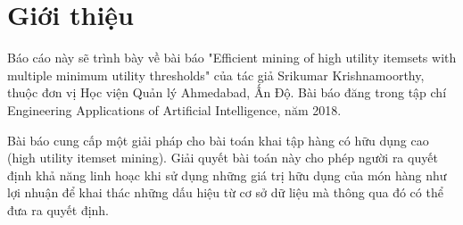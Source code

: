 



 



%

\newpage
\renewcommand{\contentsname}{Mục lục}
\tableofcontents
\newpage
\renewcommand{\listfigurename}{Hình}
\listoffigures
\newpage

\section{Giới thiệu}
Báo cáo này sẽ trình bày về bài báo "Efficient mining of high utility itemsets with multiple minimum utility thresholds" \cite{krishnamoorthy2018efficient} của tác giả Srikumar Krishnamoorthy, thuộc đơn vị Học viện Quản lý Ahmedabad, Ấn Độ. Bài báo đăng trong tập chí Engineering Applications of Artificial Intelligence, năm 2018. 

Bài báo cung cấp một giải pháp cho bài toán khai tập hàng có hữu dụng cao (high utility itemset mining). Giải quyết bài toán này cho phép người ra quyết định khả năng linh hoạc khi sử dụng những giá trị hữu dụng của món hàng như lợi nhuận để khai thác những dấu hiệu từ cơ sở dữ liệu mà thông qua đó có thể đưa ra quyết định.  

